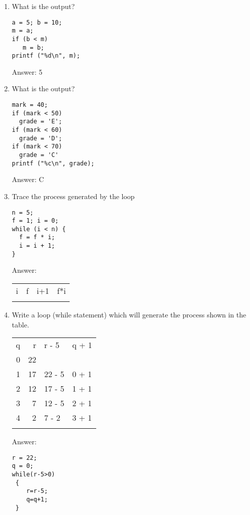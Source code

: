 \documentclass[11pt]{article}
\begin{document}
\begin{enumerate}
\item What is the output?
\begin{verbatim}
a = 5; b = 10;
m = a;
if (b < m)
   m = b;
printf ("%d\n", m);
\end{verbatim}
Answer: 5
\item What is the output?
\begin{verbatim}
mark = 40;
if (mark < 50)
  grade = 'E';
if (mark < 60)
  grade = 'D';
if (mark < 70)
  grade = 'C'
printf ("%c\n", grade);
\end{verbatim}
Answer: C
\item Trace the process generated by the loop
\begin{verbatim}
n = 5;
f = 1; i = 0;
while (i < n) {
  f = f * i;
  i = i + 1;
}
\end{verbatim}
Answer:
\begin{center}
\begin{tabular}{llll}
i & f & i+1 & f*i\\
 &  &  & \\
\end{tabular}
\end{center}
\item Write a loop (while statement) which will generate the process shown in the table.
\begin{center}
\begin{tabular}{rrll}
q & r & r - 5 & q + 1\\
0 & 22 &  & \\
1 & 17 & 22 - 5 & 0 + 1\\
2 & 12 & 17 - 5 & 1 + 1\\
3 & 7 & 12 - 5 & 2 + 1\\
4 & 2 & 7 - 2 & 3 + 1\\
 &  &  & \\
\end{tabular}
\end{center}
Answer:
\begin{verbatim}
r = 22;
q = 0;
while(r-5>0)
 {
    r=r-5;
    q=q+1;
 }
\end{verbatim}
\end{enumerate}
\end{document}
